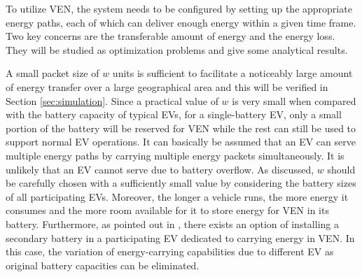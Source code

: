 \documentclass[journal]{IEEEtran}
\begin{document}
To utilize VEN, the system needs to be configured by setting up the appropriate energy paths, each of which can deliver enough energy within a given time frame. Two key concerns are the transferable amount of energy and the energy loss. They will be studied as optimization problems and give some analytical results.


A small packet size of $w$ units is sufficient to facilitate a noticeably large amount of energy transfer over a large geographical area and this will be verified in Section \ref{sec:simulation}. Since a practical value of $w$ is very small when compared with the battery capacity of typical EVs, for a single-battery EV, only a small portion of the battery will be reserved for VEN while the rest can still be used to support normal EV operations. It can basically be assumed that an EV can serve multiple energy paths by carrying multiple energy packets simultaneously. 
It is unlikely that an EV cannot serve due to battery overflow. As discussed, $w$ should be carefully chosen with a sufficiently small value by considering the battery sizes of all participating EVs. Moreover, the longer a vehicle runs, the more energy it consumes and the more room available for it to store energy for VEN in its battery. Furthermore, as pointed out in \cite{VEN_conf}, there exists an option of installing a secondary battery in a participating EV dedicated to carrying energy in VEN. In this case, the variation of energy-carrying capabilities due to different EV as original battery capacities can be eliminated.
\end{document}

